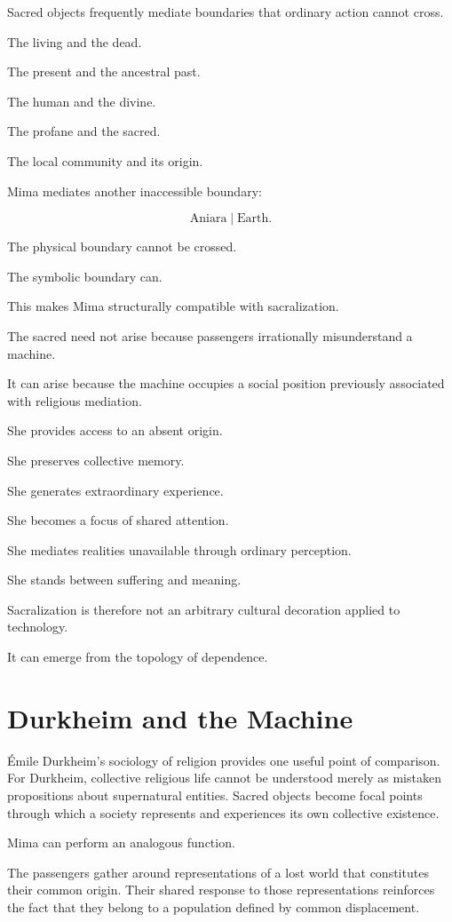 \documentclass[11pt,oneside]{book}
\theoremstyle{definition}
\theoremstyle{remark}
\begin{document}
Sacred objects frequently mediate boundaries that ordinary action cannot cross.

The living and the dead.

The present and the ancestral past.

The human and the divine.

The profane and the sacred.

The local community and its origin.

Mima mediates another inaccessible boundary:

\[
\text{Aniara}
\mid
\text{Earth}.
\]

The physical boundary cannot be crossed.

The symbolic boundary can.

This makes Mima structurally compatible with sacralization.

The sacred need not arise because passengers irrationally misunderstand a machine.

It can arise because the machine occupies a social position previously associated with religious mediation.

She provides access to an absent origin.

She preserves collective memory.

She generates extraordinary experience.

She becomes a focus of shared attention.

She mediates realities unavailable through ordinary perception.

She stands between suffering and meaning.

Sacralization is therefore not an arbitrary cultural decoration applied to technology.

It can emerge from the topology of dependence.

\section{Durkheim and the Machine}

Émile Durkheim's sociology of religion provides one useful point of comparison. For Durkheim, collective religious life cannot be understood merely as mistaken propositions about supernatural entities. Sacred objects become focal points through which a society represents and experiences its own collective existence.

Mima can perform an analogous function.

The passengers gather around representations of a lost world that constitutes their common origin. Their shared response to those representations reinforces the fact that they belong to a population defined by common displacement.
\end{document}
